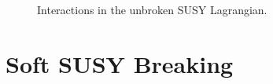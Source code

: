 \documentclass[dissertation.tex]{subfiles}
\begin{document}
\begin{figure}
	\caption{Interactions in the unbroken SUSY Lagrangian.}
	\label{fig:unbroken_SUSY_interactions}
\end{figure}

\section{Soft SUSY Breaking}
\label{sec:Soft SUSY Breaking}
\end{document}
